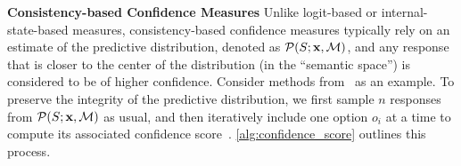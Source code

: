 


\textbf{Consistency-based Confidence Measures}
Unlike logit-based or internal-state-based measures, consistency-based confidence measures typically rely on an estimate of the predictive distribution, denoted as $\mathcal{P}(S;\mathbf{x},\mathcal{M})$, and any response that is closer to the center of the distribution (in the ``semantic space'') is considered to be of higher confidence. 
Consider methods from~\citet{lin2024generating} as an example. To preserve the integrity of the predictive distribution, we first sample $n$ responses from $\mathcal{P}(S;\mathbf{x},\mathcal{M})$ as usual, and then iteratively include one option $o_i$ at a time to compute its associated confidence score~\cite{rivera-etal-2024-combining,manakul-etal-2023-selfcheckgpt}. 
\cref{alg:confidence_score} outlines this process. 


\renewcommand{\algorithmicrequire}{\textbf{Input:}}
\renewcommand{\algorithmicensure}{\textbf{Output:}}

